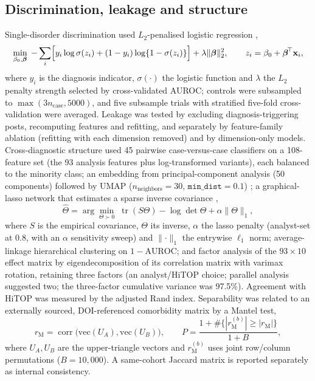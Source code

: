 \documentclass[11pt]{article}
\begin{document}
\subsection*{Discrimination, leakage and structure}
Single-disorder discrimination used $L_2$-penalised logistic regression \cite{tibshirani1996regression},
\begin{equation}
\min_{\beta_0,\boldsymbol{\beta}}\;
-\sum_{i}\Bigl[y_i\log \sigma(z_i)+(1-y_i)\log\{1-\sigma(z_i)\}\Bigr]
+\lambda\lVert\boldsymbol{\beta}\rVert_{2}^{2},\qquad z_i=\beta_0+\boldsymbol{\beta}^{\!\top}\mathbf{x}_i,
\label{eq:logreg}
\end{equation}
where $y_i$ is the diagnosis indicator, $\sigma(\cdot)$ the logistic function and $\lambda$ the $L_2$ penalty strength selected by cross-validated AUROC; controls were subsampled to
$\max(3n_{\text{case}},5000)$, and five subsample trials with stratified five-fold
cross-validation were averaged. Leakage was tested by excluding diagnosis-triggering posts,
recomputing features and refitting, and separately by feature-family ablation (refitting with
each dimension removed) and by dimension-only models. Cross-diagnostic structure used 45 pairwise
case-versus-case classifiers on a 108-feature set (the 93 analysis features plus log-transformed
variants), each balanced to the minority class; an embedding from
principal-component analysis (50 components) followed by UMAP
($n_\text{neighbors}=30$, $\texttt{min\_dist}=0.1$) \cite{mcinnes2018umap}; a graphical-lasso
network that estimates a sparse inverse covariance \cite{friedman2008sparse},
\begin{equation}
\hat{\Theta}=\arg\min_{\Theta\succ0}\;\operatorname{tr}(S\Theta)-\log\det\Theta
+\alpha\lVert\Theta\rVert_{1},
\label{eq:glasso}
\end{equation}
where $S$ is the empirical covariance, $\Theta$ its inverse, $\alpha$ the lasso penalty
(analyst-set at $0.8$, with an $\alpha$ sensitivity sweep) and $\lVert\cdot\rVert_1$ the
entrywise $\ell_1$ norm; average-linkage hierarchical
clustering on $1-\mathrm{AUROC}$; and factor analysis of the $93\times10$ effect matrix by
eigendecomposition of its correlation matrix with varimax rotation, retaining three factors (an
analyst/HiTOP choice; parallel analysis suggested two; the three-factor cumulative variance was
97.5\%). Agreement with HiTOP was measured by the adjusted Rand index. Separability was related
to an externally sourced, DOI-referenced comorbidity matrix by a Mantel test,
\begin{equation}
r_{\mathrm{M}}=\operatorname{corr}\bigl(\mathrm{vec}(U_A),\mathrm{vec}(U_B)\bigr),\qquad
P=\frac{1+\#\{|r_{\mathrm{M}}^{(b)}|\ge|r_{\mathrm{M}}|\}}{1+B},
\label{eq:mantel}
\end{equation}
where $U_A,U_B$ are the upper-triangle vectors and $r_{\mathrm{M}}^{(b)}$ uses joint
row/column permutations ($B=10{,}000$). A same-cohort Jaccard matrix is reported separately as
internal consistency.
\end{document}
